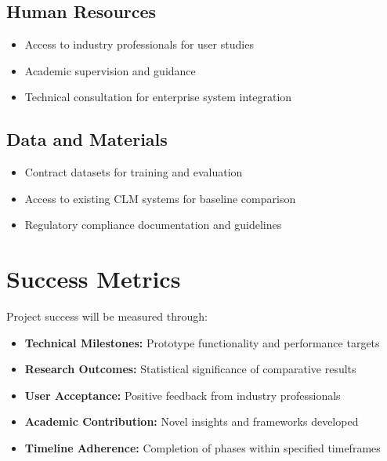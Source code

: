 \subsection{Human Resources}
\begin{itemize}
    \item Access to industry professionals for user studies
    \item Academic supervision and guidance
    \item Technical consultation for enterprise system integration
\end{itemize}

\subsection{Data and Materials}
\begin{itemize}
    \item Contract datasets for training and evaluation
    \item Access to existing CLM systems for baseline comparison
    \item Regulatory compliance documentation and guidelines
\end{itemize}

\section{Success Metrics}

Project success will be measured through:
\begin{itemize}
    \item \textbf{Technical Milestones:} Prototype functionality and performance targets
    \item \textbf{Research Outcomes:} Statistical significance of comparative results
    \item \textbf{User Acceptance:} Positive feedback from industry professionals
    \item \textbf{Academic Contribution:} Novel insights and frameworks developed
    \item \textbf{Timeline Adherence:} Completion of phases within specified timeframes
\end{itemize}
